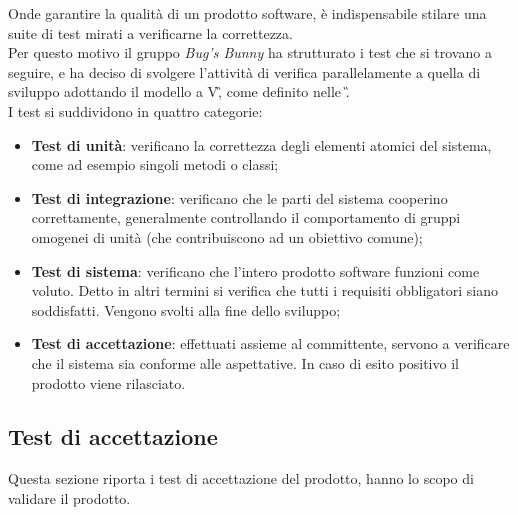 
Onde garantire la qualità di un prodotto software, è indispensabile stilare una suite di test
mirati a verificarne la correttezza. \\
Per questo motivo il gruppo \textit{Bug's Bunny} ha strutturato i test che si trovano a seguire, e ha deciso 
di svolgere l'attività di verifica parallelamente a quella di sviluppo adottando il modello a V\G, 
come definito nelle \NdP\G. \\
I test si suddividono in quattro categorie:

\begin{itemize}
	\item \textbf{Test di unità}:  verificano la correttezza degli elementi atomici del sistema, come ad esempio singoli metodi o classi;
	\item \textbf{Test di integrazione}: verificano che le parti del sistema cooperino correttamente, generalmente controllando il comportamento di gruppi omogenei di unità (che contribuiscono ad un obiettivo comune);
	\item \textbf{Test di sistema}: verificano che l'intero prodotto software funzioni come voluto. Detto in altri termini si verifica che tutti i requisiti obbligatori siano soddisfatti. Vengono svolti alla fine dello sviluppo;
	\item \textbf{Test di accettazione}: effettuati assieme al committente, servono a verificare che il sistema sia conforme alle aspettative. In caso di esito positivo il prodotto viene rilasciato.
\end{itemize}

\subsection{Test di accettazione}
Questa sezione  riporta i test di accettazione del prodotto, hanno lo scopo di validare il prodotto.


